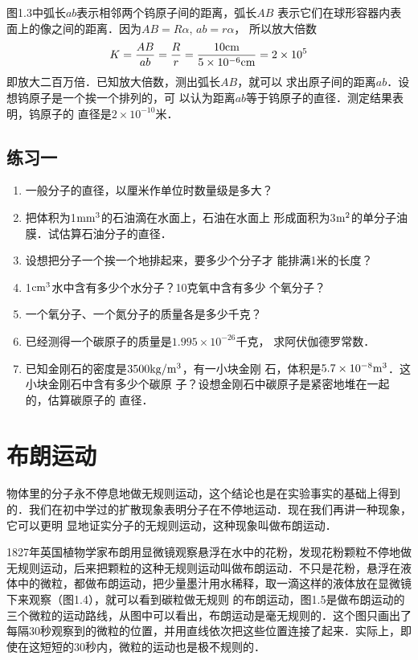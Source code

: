     图1.3中弧长$ab$表示相邻两个钨原子间的距离，弧长$AB$
表示它们在球形容器内表面上的像之间的距离．因为$AB=R\alpha$, $ab=r\alpha$，
所以放大倍数
\[K=\frac{AB}{ab}=\frac{R}{r}=\frac{10{\rm cm}}{5\times 10^{-6}{\rm cm}}=2\times 10^5 \]
即放大二百万倍．已知放大倍数，测出弧长$AB$，就可以
求出原子间的距离$ab$．设想钨原子是一个挨一个排列的，可
以认为距离$ab$等于钨原子的直径．测定结果表明，钨原子的
直径是$2\times 10^{-10}$米．


\subsection*{练习一}
\begin{enumerate}
\item  一般分子的直径，以厘米作单位时数量级是多大？
\item  把体积为1$\rm mm^3$的石油滴在水面上，石油在水面上
形成面积为3$\rm m^2$的单分子油膜．试估算石油分子的直径．
\item  设想把分子一个挨一个地排起来，要多少个分子才
能排满1米的长度？
\item  1$\rm cm^3$水中含有多少个水分子？10克氧中含有多少
个氧分子？
\item  一个氧分子、一个氮分子的质量各是多少千克？
\item  已经测得一个碳原子的质量是$1.995\times 10^{-26}$千克，
求阿伏伽德罗常数．
\item  已知金刚石的密度是$3500{\rm kg/m^3}$，有一小块金刚
石，体积是$5.7\times 10^{-8}{\rm m^3}$．这小块金刚石中含有多少个碳原
子？设想金刚石中碳原子是紧密地堆在一起的，估算碳原子的
直径．

\end{enumerate}







\section{布朗运动}
物体里的分子永不停息地做无规则运动，这个结论也是在实验事实的基础上得到的．我们在初中学过的扩散现象表明分子在不停地运动．现在我们再讲一种现象，它可以更明
显地证实分子的无规则运动，这种现象叫做布朗运动．

1827年英国植物学家布朗用显微镜观察悬浮在水中的花粉，发现花粉颗粒不停地做无规则运动，后来把颗粒的这种无规则运动叫做布朗运动．不只是花粉，悬浮在液体中的微粒，都做布朗运动，把少量墨汁用水稀释，取一滴这样的液体放在显微镜下来观察（图1.4），就可以看到碳粒做无规则
的布朗运动，图1.5是做布朗运动的三个微粒的运动路线，从图中可以看出，布朗运动是毫无规则的．这个图只画出了
每隔30秒观察到的微粒的位置，并用直线依次把这些位置连接了起来．实际上，即使在这短短的30秒内，微粒的运动也是极不规则的．

